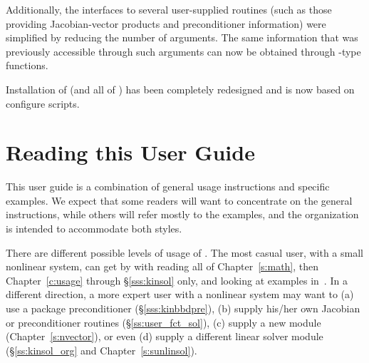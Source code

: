 Additionally, the interfaces to several user-supplied routines
(such as those providing Jacobian-vector products and
preconditioner information) were simplified by reducing the number
of arguments. The same information that was previously accessible
through such arguments can now be obtained through {-type}
functions.

Installation of {\kinsol} (and all of {\sundials}) has been completely 
redesigned and is now based on configure scripts.

\section{Reading this User Guide}\label{ss:reading}

This user guide is a combination of general usage instructions and specific
examples. We expect that some readers will want to concentrate on the general
instructions, while others will refer mostly to the examples, and the
organization is intended to accommodate both styles.

There are different possible levels of usage of {\kinsol}. The most casual
user, with a small nonlinear system, can get by with reading all of 
Chapter~\ref{s:math}, then Chapter~\ref{c:usage} through \S\ref{sss:kinsol} only, and
looking at examples in~\cite{kinsol_ex}. In a different direction, a
more expert user with a nonlinear system may want to (a) use a package
preconditioner (\S\ref{sss:kinbbdpre}), (b) supply his/her own Jacobian or
preconditioner routines (\S\ref{ss:user_fct_sol}), (c) supply a new
{\nvector} module (Chapter~\ref{s:nvector}), or even (d) supply a different
linear solver module (\S\ref{ss:kinsol_org} and Chapter~\ref{s:sunlinsol}).

